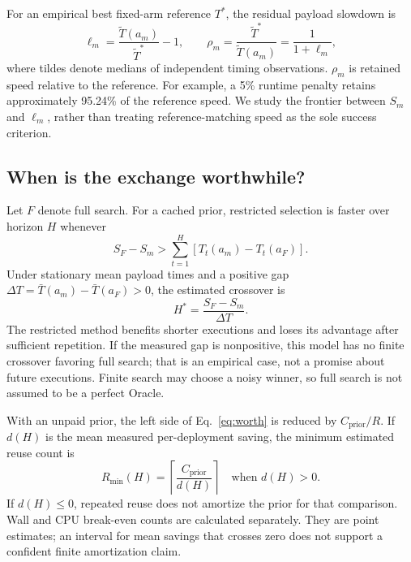 \documentclass[conference]{IEEEtran}
\begin{document}
For an empirical best fixed-arm reference $T^*$, the residual payload slowdown
is
\begin{equation}
 \ell_m=\frac{\widetilde T(a_m)}{\widetilde T^*}-1,
 \qquad \rho_m=\frac{\widetilde T^*}{\widetilde T(a_m)}
              =\frac{1}{1+\ell_m},
 \label{eq:quality}
\end{equation}
where tildes denote medians of independent timing observations.
$\rho_m$ is retained speed relative to the reference. For example, a 5\%
runtime penalty retains approximately 95.24\% of the reference speed.
We study the frontier between $S_m$ and $\ell_m$, rather than treating
reference-matching speed as the sole success criterion.

\subsection{When is the exchange worthwhile?}

Let $F$ denote full search. For a cached prior, restricted selection is faster
over horizon $H$ whenever
\begin{equation}
 S_F-S_m > \sum_{t=1}^{H}\left[T_t(a_m)-T_t(a_F)\right].
 \label{eq:worth}
\end{equation}
Under stationary mean payload times and a positive gap
$\Delta T=\bar T(a_m)-\bar T(a_F)>0$, the estimated crossover is
\begin{equation}
 H^*=\frac{S_F-S_m}{\Delta T}.
 \label{eq:crossover}
\end{equation}
The restricted method benefits shorter executions and loses its advantage
after sufficient repetition. If the measured gap is nonpositive, this model
has no finite crossover favoring full search; that is an empirical case,
not a promise about future executions. Finite search may choose a noisy winner,
so full search is not assumed to be a perfect Oracle.

With an unpaid prior, the left side of Eq.~\ref{eq:worth} is reduced by
$C_{\mathrm{prior}}/R$. If $d(H)$ is the mean measured per-deployment saving,
the minimum estimated reuse count is
\begin{equation}
 R_{\min}(H)=\left\lceil\frac{C_{\mathrm{prior}}}{d(H)}\right\rceil
 \quad\text{when }d(H)>0.
 \label{eq:reuse}
\end{equation}
If $d(H)\leq0$, repeated reuse does not amortize the prior for that comparison.
Wall and CPU break-even counts are calculated separately.
They are point estimates; an interval for mean savings that crosses zero
does not support a confident finite amortization claim.
\end{document}
